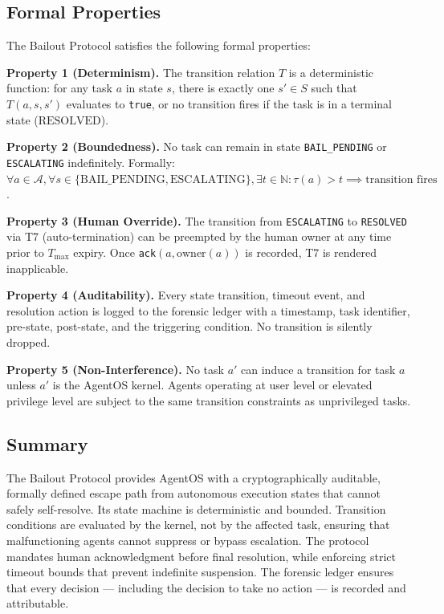 \subsection{Formal Properties}

The Bailout Protocol satisfies the following formal properties:

\medskip\noindent\textbf{Property 1 (Determinism).} The transition relation $T$ is a deterministic function: for any task $a$ in state $s$, there is exactly one $s' \in S$ such that $T(a, s, s')$ evaluates to \texttt{true}, or no transition fires if the task is in a terminal state ($\text{RESOLVED}$).

\medskip\noindent\textbf{Property 2 (Boundedness).} No task can remain in state \texttt{BAIL\_PENDING} or \texttt{ESCALATING} indefinitely. Formally: $\forall a \in \mathcal{A}, \forall s \in \{\text{BAIL\_PENDING}, \text{ESCALATING}\}, \exists t \in \mathbb{N} : \tau(a) > t \implies \text{transition fires}$.

\medskip\noindent\textbf{Property 3 (Human Override).} The transition from \texttt{ESCALATING} to \texttt{RESOLVED} via T7 (auto-termination) can be preempted by the human owner at any time prior to $T_\text{max}$ expiry. Once \texttt{ack}$(a, \text{owner}(a))$ is recorded, T7 is rendered inapplicable.

\medskip\noindent\textbf{Property 4 (Auditability).} Every state transition, timeout event, and resolution action is logged to the forensic ledger with a timestamp, task identifier, pre-state, post-state, and the triggering condition. No transition is silently dropped.

\medskip\noindent\textbf{Property 5 (Non-Interference).} No task $a'$ can induce a transition for task $a$ unless $a'$ is the AgentOS kernel. Agents operating at user level or elevated privilege level are subject to the same transition constraints as unprivileged tasks.

\subsection{Summary}

The Bailout Protocol provides AgentOS with a cryptographically auditable, formally defined escape path from autonomous execution states that cannot safely self-resolve. Its state machine is deterministic and bounded. Transition conditions are evaluated by the kernel, not by the affected task, ensuring that malfunctioning agents cannot suppress or bypass escalation. The protocol mandates human acknowledgment before final resolution, while enforcing strict timeout bounds that prevent indefinite suspension. The forensic ledger ensures that every decision — including the decision to take no action — is recorded and attributable.
